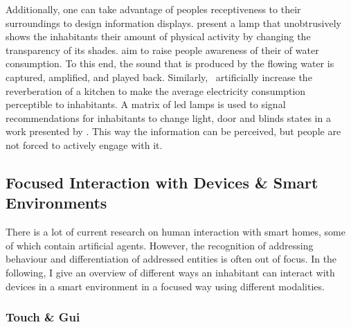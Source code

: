 Additionally, one can take advantage of peoples receptiveness to their surroundings to design information displays.
 present a lamp that unobtrusively shows the inhabitants their amount of physical activity by changing the transparency of its shades.
 aim to raise people awareness of their of water consumption.
To this end, the sound that is produced by the flowing water is captured, amplified, and played back.
Similarly,~ artificially increase the reverberation of a kitchen to make the average electricity consumption perceptible to inhabitants.
A matrix of led lamps is used to signal recommendations for inhabitants to change light, door and blinds states in a work presented by .
This way the information can be perceived, but people are not forced to actively engage with it.

\subsection[Focused Interaction]{Focused Interaction with Devices \& Smart Environments}\label{sec.rw.hi.focused-dev-rw}

There is a lot of current research on human interaction with \glspl{smart home}, some of which contain \glspl{artificial agent}.
However, the recognition of addressing behaviour and differentiation of addressed entities is often out of focus.
In the following, I give an overview of different ways an inhabitant can interact with \glspl{device} in a \gls{smart environment} in a focused way using different modalities.

\subsubsection{Touch \& Gui}\label{sec.rw.hi.focused-dev-rw.touch}

